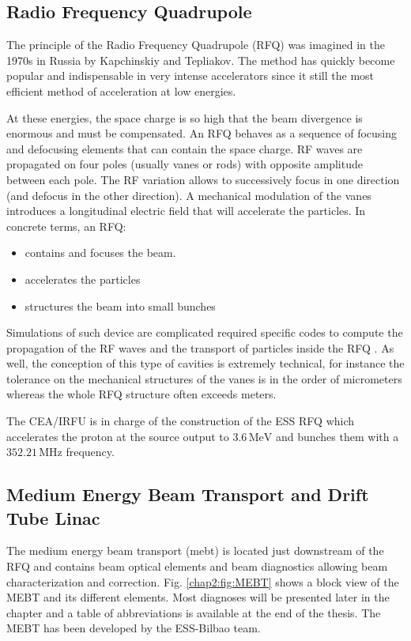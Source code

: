 \begin{refsection}
  

  \subsection{Radio Frequency Quadrupole}
  The principle of the Radio Frequency Quadrupole (RFQ) was imagined in the 1970s in Russia by Kapchinskiy and Tepliakov. The method has quickly become popular and indispensable in very intense accelerators since it still the most efficient method of acceleration at low energies.

  At these energies, the space charge is so high that the beam divergence is enormous and must be compensated. An RFQ behaves as a sequence of focusing and defocusing elements that can contain the space charge. RF waves are propagated on four poles (usually vanes or rods) with opposite amplitude between each pole. The RF variation allows to successively focus in one direction (and defocus in the other direction). A mechanical modulation of the vanes introduces a longitudinal electric field that will accelerate the particles. In concrete terms, an RFQ:
  \begin{itemize}
    \item contains and focuses the beam.
    \item accelerates the particles
    \item structures the beam into small bunches
  \end{itemize}

  

  Simulations of such device are complicated required specific codes to compute the propagation of the RF waves and the transport of particles inside the RFQ \cite{Duperrier2000}. As well, the conception of this type of cavities is extremely technical, for instance the tolerance on the mechanical structures of the vanes is in the order of micrometers whereas the whole RFQ structure often exceeds meters.

  The CEA/IRFU is in charge of the construction of the ESS RFQ \cite{ChirpazIPAC2016} which accelerates the proton at the source output to $3.6\,\mathrm{MeV}$ and bunches them with a $352.21\,\mathrm{MHz}$ frequency.

  \subsection{Medium Energy Beam Transport and Drift Tube Linac}
  The medium energy beam transport (\acrshort{mebt}) is located just downstream of the RFQ and contains beam optical elements and beam diagnostics allowing beam characterization and correction. Fig. \ref{chap2:fig:MEBT} shows a block view of the MEBT and its different elements. Most diagnoses will be presented later in the chapter and a table of abbreviations is available at the end of the thesis. The MEBT has been developed by the ESS-Bilbao team.


\end{refsection}
